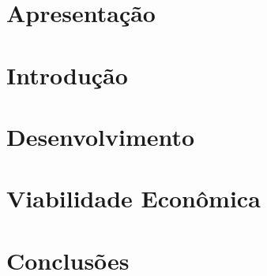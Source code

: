 


\chapter{Apresentação}

\chapter{Introdução} %


\chapter{Desenvolvimento}


\chapter{Viabilidade Econômica}


\chapter{Conclusões}

